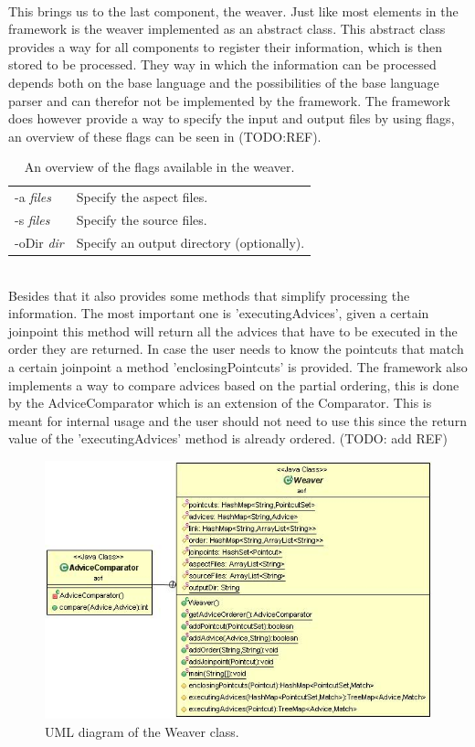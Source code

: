 \documentclass[a4paper]{report}
\begin{document}
\\
This brings us to the last component, the weaver. Just like most elements in the framework is the weaver implemented as an abstract class. This abstract class provides a way for all components to register their information, which is then stored to be processed. They way in which the information can be processed depends both on the base language and the possibilities of the base language parser and can therefor not be implemented by the framework. The framework does however provide a way to specify the input and output files by using flags, an overview of these flags can be seen in (TODO:REF).
\begin{table}[h]
\centering
\begin{tabular}{l l}
-a \textit{files} & Specify the aspect files.\\ [2ex]
-s \textit{files} & Specify the source files.\\ [2ex]
-oDir \textit{dir} & Specify an output directory (optionally).\\
\end{tabular}
\caption[tab:Flags]{An overview of the flags available in the weaver.}
\label{tab:Flags}
\end{table}\\
Besides that it also provides some methods that simplify processing the information. The most important one is 'executingAdvices', given a certain joinpoint this method will return all the advices that have to be executed in the order they are returned. In case the user needs to know the pointcuts that match a certain joinpoint a method 'enclosingPointcuts' is provided. The framework also implements a way to compare advices based on the partial ordering, this is done by the AdviceComparator which is an extension of the Comparator. This is meant for internal usage and the user should not need to use this since the return value of the 'executingAdvices' method is already ordered. (TODO: add REF)
\begin{figure}[h!]
\centering
\includegraphics[scale=0.7]{images/AOF/Weaver.jpg}
\caption{UML diagram of the Weaver class.}
\label{fig:Weaver}
\end{figure}\\
\end{document}
